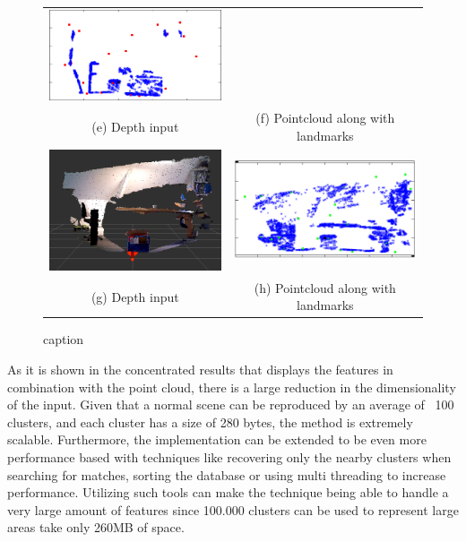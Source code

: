 \documentclass[twoside,hidelinks]{article}
\begin{document}
\begin{figure}
\begin{tabular}{cc}
  \includegraphics[width=85mm]{box/clusters3} \\
(e) Depth input & (f) Pointcloud along with landmarks \\[6pt]
	\includegraphics[width=60mm]{box/input4} & 
  \includegraphics[width=85mm]{box/clusters4} \\
(g) Depth input & (h) Pointcloud along with landmarks \\[6pt]
\end{tabular}
\caption{caption}
\end{figure}


As it is shown in the concentrated results that displays the features in combination with the point cloud, there is a large reduction in the dimensionality of the input. Given that a normal scene can be reproduced by an average of ~100 clusters, and each cluster has a size of 280 bytes, the method is extremely scalable. Furthermore, the implementation can be extended to be even more performance based with techniques like recovering only the nearby clusters when searching for matches, sorting the database or using multi threading to increase performance. Utilizing such tools can make the technique being able to handle a very large amount of features since 100.000 clusters can be used to represent large areas take only 260MB of space.
\end{document}
